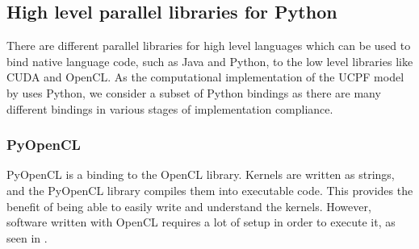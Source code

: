 








\subsection{High level parallel libraries for Python}
\label{subsec:highlevellibs}
There are different parallel libraries for high level languages which can be used to bind native language code, such as Java and Python, to the low level libraries like CUDA and OpenCL. 
As the computational implementation of the UCPF model by \cite{saul2011} uses Python, we consider a subset of Python bindings as there are many different bindings in various stages of implementation compliance.


\subsubsection{PyOpenCL}
PyOpenCL\cite{kloeckner_pycuda_2012} is a binding to the OpenCL library.
Kernels are written as strings, and the PyOpenCL library compiles them into executable code.
This provides the benefit of being able to easily write and understand the kernels.
However, software written with OpenCL requires a lot of setup in order to execute it, as seen in .

